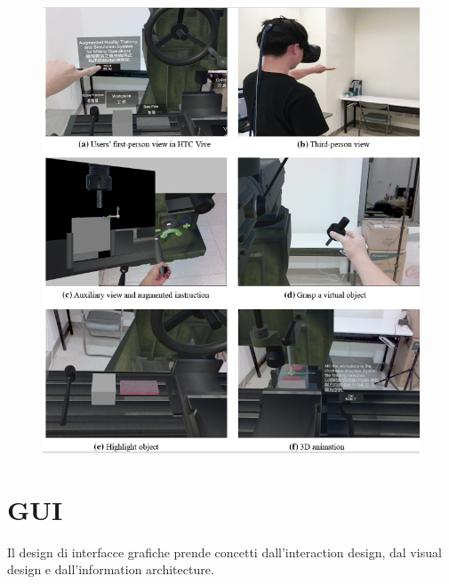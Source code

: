 \begin{figure}[!h]
	\centering
	\includegraphics[scale=0.5]{immagini/rbi-esempio.png}
\end{figure}

\section{GUI}
Il design di interfacce grafiche prende concetti dall'interaction design, dal visual design e dall'information architecture.

